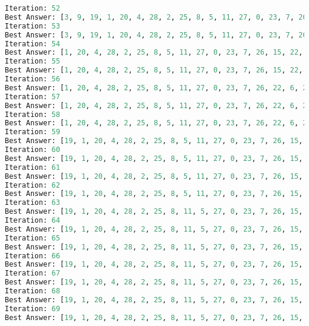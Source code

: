 \documentclass[a4paper, 12pt]{article}
\theoremstyle{definition}
\begin{document}
\begin{lstlisting}[language=Python]
Iteration: 52
Best Answer: [3, 9, 19, 1, 20, 4, 28, 2, 25, 8, 5, 11, 27, 0, 23, 7, 26, 15, 22, 6, 24, 18, 10, 21, 16, 13, 17, 14, 12]: 1671
Iteration: 53
Best Answer: [3, 9, 19, 1, 20, 4, 28, 2, 25, 8, 5, 11, 27, 0, 23, 7, 26, 15, 22, 6, 24, 18, 10, 21, 16, 13, 17, 14, 12]: 1671
Iteration: 54
Best Answer: [1, 20, 4, 28, 2, 25, 8, 5, 11, 27, 0, 23, 7, 26, 15, 22, 6, 24, 18, 10, 21, 16, 13, 17, 14, 3, 9, 12, 19]: 1656
Iteration: 55
Best Answer: [1, 20, 4, 28, 2, 25, 8, 5, 11, 27, 0, 23, 7, 26, 15, 22, 6, 24, 18, 10, 21, 16, 13, 17, 14, 3, 9, 12, 19]: 1656
Iteration: 56
Best Answer: [1, 20, 4, 28, 2, 25, 8, 5, 11, 27, 0, 23, 7, 26, 22, 6, 24, 15, 12, 18, 10, 21, 16, 13, 17, 14, 3, 9, 19]: 1641
Iteration: 57
Best Answer: [1, 20, 4, 28, 2, 25, 8, 5, 11, 27, 0, 23, 7, 26, 22, 6, 24, 15, 12, 18, 10, 21, 16, 13, 17, 14, 3, 9, 19]: 1641
Iteration: 58
Best Answer: [1, 20, 4, 28, 2, 25, 8, 5, 11, 27, 0, 23, 7, 26, 22, 6, 24, 15, 12, 18, 10, 21, 16, 13, 17, 14, 3, 9, 19]: 1641
Iteration: 59
Best Answer: [19, 1, 20, 4, 28, 2, 25, 8, 5, 11, 27, 0, 23, 7, 26, 15, 22, 6, 24, 18, 10, 21, 16, 13, 17, 14, 3, 12, 9]: 1631
Iteration: 60
Best Answer: [19, 1, 20, 4, 28, 2, 25, 8, 5, 11, 27, 0, 23, 7, 26, 15, 22, 6, 24, 18, 10, 21, 16, 13, 17, 14, 3, 12, 9]: 1631
Iteration: 61
Best Answer: [19, 1, 20, 4, 28, 2, 25, 8, 5, 11, 27, 0, 23, 7, 26, 15, 22, 6, 24, 18, 10, 21, 16, 13, 17, 14, 3, 12, 9]: 1631
Iteration: 62
Best Answer: [19, 1, 20, 4, 28, 2, 25, 8, 5, 11, 27, 0, 23, 7, 26, 15, 22, 6, 24, 18, 10, 21, 16, 13, 17, 14, 3, 12, 9]: 1631
Iteration: 63
Best Answer: [19, 1, 20, 4, 28, 2, 25, 8, 11, 5, 27, 0, 23, 7, 26, 15, 22, 6, 24, 18, 10, 21, 16, 13, 17, 14, 3, 12, 9]: 1624
Iteration: 64
Best Answer: [19, 1, 20, 4, 28, 2, 25, 8, 11, 5, 27, 0, 23, 7, 26, 15, 22, 6, 24, 18, 10, 21, 16, 13, 17, 14, 3, 12, 9]: 1624
Iteration: 65
Best Answer: [19, 1, 20, 4, 28, 2, 25, 8, 11, 5, 27, 0, 23, 7, 26, 15, 22, 6, 24, 18, 10, 21, 16, 13, 17, 14, 3, 12, 9]: 1624
Iteration: 66
Best Answer: [19, 1, 20, 4, 28, 2, 25, 8, 11, 5, 27, 0, 23, 7, 26, 15, 22, 6, 24, 18, 10, 21, 16, 13, 17, 14, 3, 12, 9]: 1624
Iteration: 67
Best Answer: [19, 1, 20, 4, 28, 2, 25, 8, 11, 5, 27, 0, 23, 7, 26, 15, 22, 6, 24, 18, 10, 21, 16, 13, 17, 14, 3, 12, 9]: 1624
Iteration: 68
Best Answer: [19, 1, 20, 4, 28, 2, 25, 8, 11, 5, 27, 0, 23, 7, 26, 15, 22, 6, 24, 18, 10, 21, 16, 13, 17, 14, 3, 12, 9]: 1624
Iteration: 69
Best Answer: [19, 1, 20, 4, 28, 2, 25, 8, 11, 5, 27, 0, 23, 7, 26, 15, 22, 6, 24, 18, 10, 21, 16, 13, 17, 14, 3, 12, 9]: 1624    
\end{lstlisting}
\RTL
\end{document}
